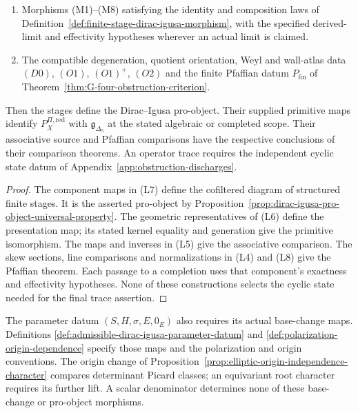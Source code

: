 \begin{theorem}
\begin{enumerate}
\textup{(S1)}--\textup{(S10)}, or their exhaustive finite
realization in Definition~\ref{def:cofinal-primitive-recognition-datum}.
\item[\textup{(L7)}] Morphisms \textup{(M1)}--\textup{(M8)}
satisfying the identity and composition laws of
Definition~\ref{def:finite-stage-dirac-igusa-morphism}, with the
specified derived-limit and effectivity hypotheses wherever an
actual limit is claimed.
\item[\textup{(L8)}] The compatible degeneration, quotient
orientation, Weyl and wall-atlas data
\((D0)\), \((O1)\), \((O1)^+\), \((O2)\) and the finite Pfaffian datum
\(P_{\mathrm{fin}}\) of
Theorem~\ref{thm:G-four-obstruction-criterion}.
\end{enumerate}
Then the stages define the Dirac--Igusa pro-object. Their supplied
primitive maps identify \(P_X^{\Pi,\mathrm{red}}\) with
\(\mathfrak g_{\Delta_5}\) at the stated algebraic or completed
scope. Their associative source and Pfaffian comparisons have the
respective conclusions of their comparison theorems. An operator
trace requires the independent cyclic state datum of
Appendix~\ref{app:obstruction-discharges}.
\end{theorem}
\begin{proof}
The component maps in \textup{(L7)} define the cofiltered diagram
of structured finite stages. It is the asserted pro-object by
Proposition~\ref{prop:dirac-igusa-pro-object-universal-property}.
The geometric representatives of \textup{(L6)} define the
presentation map; its stated kernel equality and generation give
the primitive isomorphism. The maps and inverses in
\textup{(L5)} give the associative comparison. The skew sections,
line comparisons and normalizations in \textup{(L4)} and
\textup{(L8)} give the Pfaffian theorem. Each passage to a
completion uses that component's exactness and effectivity
hypotheses. None of these constructions selects the cyclic state
needed for the final trace assertion.
\end{proof}

The parameter datum \((S,H,\sigma,E,0_E)\) also requires its
actual base-change maps. Definitions
\ref{def:admissible-dirac-igusa-parameter-datum} and
\ref{def:polarization-origin-dependence} specify those maps and
the polarization and origin conventions. The origin change of
Proposition~\ref{prop:elliptic-origin-independence-character}
compares determinant Picard classes; an equivariant root character
requires its further lift. A scalar denominator determines none
of these base-change or pro-object morphisms.
